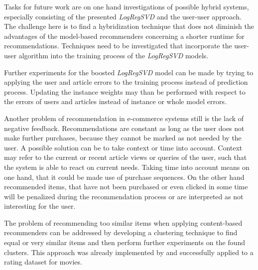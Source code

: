 \documentclass[10pt]{reportMaster}
\begin{document}
Tasks for future work are on one hand investigations of possible hybrid systems, especially consisting of the presented \textit{LogRegSVD} and the user-user approach.
The challenge here is to find a hybridization technique that does not diminish the advantages of the model-based recommenders concerning a shorter runtime for recommendations.
Techniques need to be investigated that incorporate the user-user algorithm into the training process of the \textit{LogRegSVD} models.

Further experiments for the boosted \textit{LogRegSVD} model can be made by trying to applying the user and article errors to the training process instead of prediction process.
Updating the instance weights may than be performed with respect to the errors of users and articles instead of instance or whole model errors.

Another problem of recommendation in e-commerce systems still is the lack of negative feedback.
Recommendations are constant as long as the user does not make further purchases, because they cannot be marked as not needed by the user.
A possible solution can be to take context or time into account.
Context may refer to the current or recent article views or queries of the user, such that the system is able to react on current needs.
Taking time into account means on one hand, that it could be made use of purchase sequences.
On the other hand recommended items, that have not been purchased or even clicked in some time will be penalized during the recommendation process or are interpreted as not interesting for the user.

The problem of recommending too similar items when applying content-based recommenders can be addressed by developing a clustering technique to find equal or very similar items and then perform further experiments on the found clusters. 
This approach was already implemented by \cite{hybridCFCBClustringLi} and successfully applied to a rating dataset for movies. 





\end{document}
